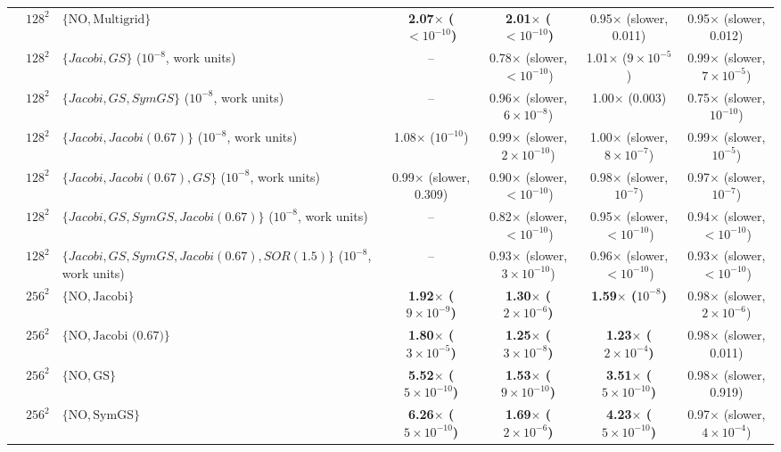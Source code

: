 {\begin{tabular}{lllcccc}
 & $128^2$ & $\{\mathrm{NO}, \text{Multigrid}\}$ & \textbf{2.07$\times$ ($<10^{-10}$)} & \textbf{2.01$\times$ ($<10^{-10}$)} & 0.95$\times$ (slower, 0.011) & 0.95$\times$ (slower, 0.012) \\
 & $128^2$ & $\{Jacobi, GS\}$ ($10^{-8}$, work units) & -- & 0.78$\times$ (slower, $<10^{-10}$) & 1.01$\times$ ($9\times10^{-5}$) & 0.99$\times$ (slower, $7\times10^{-5}$) \\
 & $128^2$ & $\{Jacobi, GS, SymGS\}$ ($10^{-8}$, work units) & -- & 0.96$\times$ (slower, $6\times10^{-8}$) & 1.00$\times$ (0.003) & 0.75$\times$ (slower, $10^{-10}$) \\
 & $128^2$ & $\{Jacobi, Jacobi (0.67)\}$ ($10^{-8}$, work units) & 1.08$\times$ ($10^{-10}$) & 0.99$\times$ (slower, $2\times10^{-10}$) & 1.00$\times$ (slower, $8\times10^{-7}$) & 0.99$\times$ (slower, $10^{-5}$) \\
 & $128^2$ & $\{Jacobi, Jacobi (0.67), GS\}$ ($10^{-8}$, work units) & 0.99$\times$ (slower, 0.309) & 0.90$\times$ (slower, $<10^{-10}$) & 0.98$\times$ (slower, $10^{-7}$) & 0.97$\times$ (slower, $10^{-7}$) \\
 & $128^2$ & $\{Jacobi, GS, SymGS, Jacobi (0.67)\}$ ($10^{-8}$, work units) & -- & 0.82$\times$ (slower, $<10^{-10}$) & 0.95$\times$ (slower, $<10^{-10}$) & 0.94$\times$ (slower, $<10^{-10}$) \\
 & $128^2$ & $\{Jacobi, GS, SymGS, Jacobi (0.67), SOR (1.5)\}$ ($10^{-8}$, work units) & -- & 0.93$\times$ (slower, $3\times10^{-10}$) & 0.96$\times$ (slower, $<10^{-10}$) & 0.93$\times$ (slower, $<10^{-10}$) \\
 & $256^2$ & $\{\mathrm{NO}, \text{Jacobi}\}$ & \textbf{1.92$\times$ ($9\times10^{-9}$)} & \textbf{1.30$\times$ ($2\times10^{-6}$)} & \textbf{1.59$\times$ ($10^{-8}$)} & 0.98$\times$ (slower, $2\times10^{-6}$) \\
 & $256^2$ & $\{\mathrm{NO}, \text{Jacobi (0.67)}\}$ & \textbf{1.80$\times$ ($3\times10^{-5}$)} & \textbf{1.25$\times$ ($3\times10^{-8}$)} & \textbf{1.23$\times$ ($2\times10^{-4}$)} & 0.98$\times$ (slower, 0.011) \\
 & $256^2$ & $\{\mathrm{NO}, \text{GS}\}$ & \textbf{5.52$\times$ ($5\times10^{-10}$)} & \textbf{1.53$\times$ ($9\times10^{-10}$)} & \textbf{3.51$\times$ ($5\times10^{-10}$)} & 0.98$\times$ (slower, 0.919) \\
 & $256^2$ & $\{\mathrm{NO}, \text{SymGS}\}$ & \textbf{6.26$\times$ ($5\times10^{-10}$)} & \textbf{1.69$\times$ ($2\times10^{-6}$)} & \textbf{4.23$\times$ ($5\times10^{-10}$)} & 0.97$\times$ (slower, $4\times10^{-4}$) \\

\end{tabular}}
